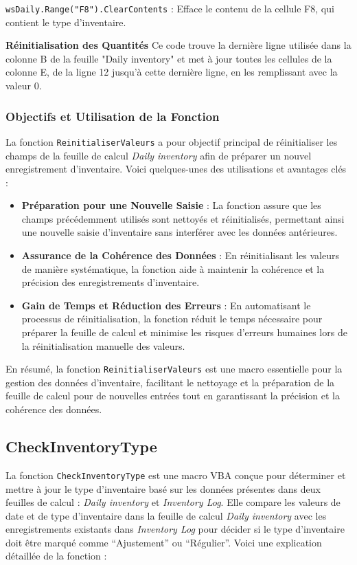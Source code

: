 \documentclass[a4paper, oneside, 12pt, final]{extreport}
\begin{document}
\texttt{wsDaily.Range("F8").ClearContents} : Efface le contenu de la cellule F8, qui contient le type d'inventaire.

\textbf{Réinitialisation des Quantités}
Ce code trouve la dernière ligne utilisée dans la colonne B de la feuille "Daily inventory" et met à jour toutes les cellules de la colonne E, de la ligne 12 jusqu'à cette dernière ligne, en les remplissant avec la valeur 0.
\subsubsection{Objectifs et Utilisation de la Fonction}

La fonction \texttt{ReinitialiserValeurs} a pour objectif principal de réinitialiser les champs de la feuille de calcul \textit{Daily inventory} afin de préparer un nouvel enregistrement d'inventaire. Voici quelques-unes des utilisations et avantages clés :

\begin{itemize}
    \item \textbf{Préparation pour une Nouvelle Saisie} : La fonction assure que les champs précédemment utilisés sont nettoyés et réinitialisés, permettant ainsi une nouvelle saisie d'inventaire sans interférer avec les données antérieures.
    \item \textbf{Assurance de la Cohérence des Données} : En réinitialisant les valeurs de manière systématique, la fonction aide à maintenir la cohérence et la précision des enregistrements d'inventaire.
    \item \textbf{Gain de Temps et Réduction des Erreurs} : En automatisant le processus de réinitialisation, la fonction réduit le temps nécessaire pour préparer la feuille de calcul et minimise les risques d'erreurs humaines lors de la réinitialisation manuelle des valeurs.
\end{itemize}

En résumé, la fonction \texttt{ReinitialiserValeurs} est une macro essentielle pour la gestion des données d'inventaire, facilitant le nettoyage et la préparation de la feuille de calcul pour de nouvelles entrées tout en garantissant la précision et la cohérence des données.
\subsection{CheckInventoryType}

La fonction \texttt{CheckInventoryType} est une macro VBA conçue pour déterminer et mettre à jour le type d'inventaire basé sur les données présentes dans deux feuilles de calcul : \textit{Daily inventory} et \textit{Inventory Log}. Elle compare les valeurs de date et de type d'inventaire dans la feuille de calcul \textit{Daily inventory} avec les enregistrements existants dans \textit{Inventory Log} pour décider si le type d'inventaire doit être marqué comme ``Ajustement'' ou ``Régulier''. Voici une explication détaillée de la fonction :
\end{document}
